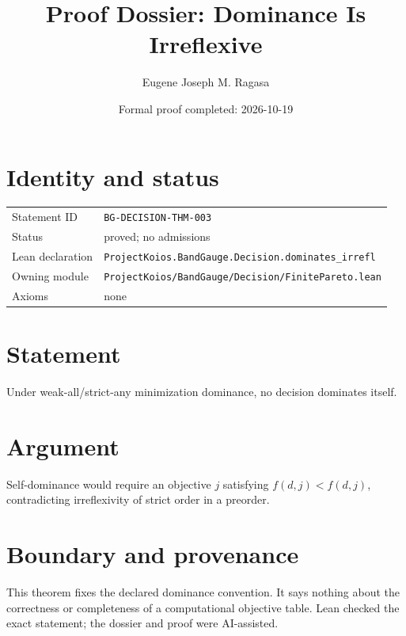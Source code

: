 \documentclass[11pt]{article}
\title{Proof Dossier: Dominance Is Irreflexive}
\author{Eugene Joseph M. Ragasa}
\date{Formal proof completed: 2026-10-19}
\begin{document}
\maketitle
\section{Identity and status}
\begin{tabularx}{\textwidth}{@{}lX@{}}\toprule
Statement ID & \texttt{BG-DECISION-THM-003} \\
Status & proved; no admissions \\
Lean declaration & \texttt{ProjectKoios.BandGauge.Decision.dominates\_irrefl} \\
Owning module & \texttt{ProjectKoios/BandGauge/Decision/FinitePareto.lean} \\
Axioms & none \\
\bottomrule\end{tabularx}
\section{Statement}
Under weak-all/strict-any minimization dominance, no decision dominates itself.
\section{Argument}
Self-dominance would require an objective $j$ satisfying $f(d,j)<f(d,j)$, contradicting
irreflexivity of strict order in a preorder.
\section{Boundary and provenance}
This theorem fixes the declared dominance convention. It says nothing about the
correctness or completeness of a computational objective table. Lean checked the exact
statement; the dossier and proof were AI-assisted.
\end{document}
